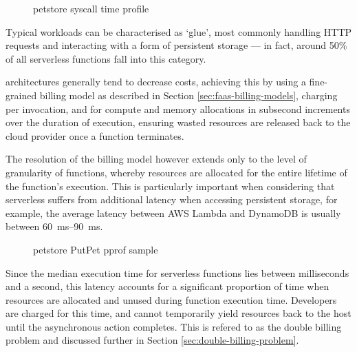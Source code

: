 \begin{figure}
    \begin{center}
        
    \end{center}
    \caption{\faas{} petstore syscall time profile}
    \label{fig:faas-strace-time-intro-experiment}
\end{figure}

Typical \faas{} workloads can be characterised as `glue', most commonly handling HTTP requests and interacting with a form of persistent storage --- in fact, around 50\% of all serverless functions fall into this category\cite{eismannReviewServerlessUse2020}.

\faas{} architectures generally tend to decrease costs, achieving this by using a fine-grained billing model as described in Section \ref{sec:faas-billing-models}, charging per invocation, and for compute and memory allocations in subsecond increments over the duration of execution, ensuring wasted resources are released back to the cloud provider once a function terminates.

The resolution of the billing model however extends only to the level of granularity of functions, whereby resources are allocated for the entire lifetime of the function's execution. This is particularly important when considering that serverless suffers from additional latency when accessing persistent storage, for example, the average latency between AWS Lambda and DynamoDB is usually between \qtyrange{60}{90}{\ms}\cite{ghoshCachingTechniquesImprove2020}.

\begin{figure*}
    \begin{center}
        \begin{tikzpicture}[scale = 0.75, every node/.style={scale=0.75}]
            
        \end{tikzpicture}
    \end{center}
    \caption{\faas{} petstore PutPet pprof sample}
    \label{fig:faas-pprof-intro-experiment}
\end{figure*}

Since the median execution time for serverless functions lies between milliseconds and a second\cite{eismannReviewServerlessUse2020}, this latency accounts for a significant proportion of time when resources are allocated and unused during function execution time. Developers are charged for this time, and cannot temporarily yield resources back to the host until the asynchronous action completes. This is refered to as the double billing problem\cite{baldiniServerlessTrilemmaFunction2017,yuCharacterizingServerlessPlatforms2020} and discussed further in Section \ref{sec:double-billing-problem}.

